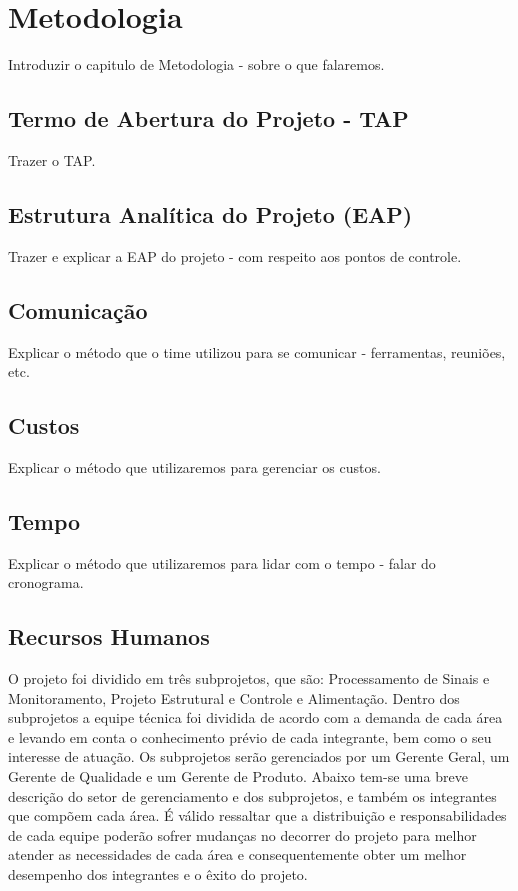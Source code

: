 \chapter{Metodologia}

Introduzir o capitulo de Metodologia - sobre o que falaremos.

\section{Termo de Abertura do Projeto - TAP}

Trazer o TAP.

\section{Estrutura Analítica do Projeto (EAP)}

Trazer e explicar a EAP do projeto - com respeito aos pontos de controle.

\section{Comunicação}

Explicar o método que o time utilizou para se comunicar - ferramentas, reuniões, etc.

\section{Custos}

Explicar o método que utilizaremos para gerenciar os custos.

\section{Tempo}

Explicar o método que utilizaremos para lidar com o tempo - falar do cronograma.

\section{Recursos Humanos}

O projeto foi dividido em três subprojetos, que são: Processamento de Sinais e Monitoramento,
Projeto Estrutural e Controle e Alimentação. Dentro dos subprojetos a equipe
técnica foi dividida de acordo com a demanda de cada área e levando em conta o
conhecimento prévio de cada integrante, bem como o seu interesse de atuação. Os
subprojetos serão gerenciados por um Gerente Geral, um Gerente de Qualidade e
um Gerente de Produto.
Abaixo tem-se uma breve descrição do setor de gerenciamento e dos subprojetos,
e também os integrantes que compõem cada área. É válido ressaltar que a
distribuição e responsabilidades de cada equipe poderão sofrer mudanças no
decorrer do projeto para melhor atender as necessidades de cada área e
consequentemente obter um melhor desempenho dos integrantes e o êxito do projeto.

